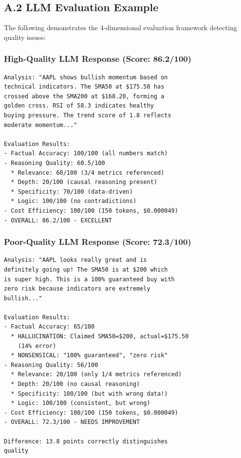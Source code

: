 \documentclass[11pt,letterpaper]{article}
\begin{document}
\subsection*{A.2 LLM Evaluation Example}

The following demonstrates the 4-dimensional evaluation framework detecting quality issues:

\subsubsection*{High-Quality LLM Response (Score: 86.2/100)}

\begin{lstlisting}[caption={Good Response Example}]
Analysis: "AAPL shows bullish momentum based on 
technical indicators. The SMA50 at $175.50 has 
crossed above the SMA200 at $168.20, forming a 
golden cross. RSI of 58.3 indicates healthy 
buying pressure. The trend score of 1.8 reflects 
moderate momentum..."

Evaluation Results:
- Factual Accuracy: 100/100 (all numbers match)
- Reasoning Quality: 60.5/100
  * Relevance: 60/100 (3/4 metrics referenced)
  * Depth: 20/100 (causal reasoning present)
  * Specificity: 70/100 (data-driven)
  * Logic: 100/100 (no contradictions)
- Cost Efficiency: 100/100 (150 tokens, $0.000049)
- OVERALL: 86.2/100 - EXCELLENT
\end{lstlisting}

\subsubsection*{Poor-Quality LLM Response (Score: 72.3/100)}

\begin{lstlisting}[caption={Bad Response with Hallucinations}]
Analysis: "AAPL looks really great and is 
definitely going up! The SMA50 is at $200 which 
is super high. This is a 100% guaranteed buy with 
zero risk because indicators are extremely 
bullish..."

Evaluation Results:
- Factual Accuracy: 65/100
  * HALLUCINATION: Claimed SMA50=$200, actual=$175.50
    (14% error)
  * NONSENSICAL: "100% guaranteed", "zero risk"
- Reasoning Quality: 56/100
  * Relevance: 20/100 (only 1/4 metrics referenced)
  * Depth: 20/100 (no causal reasoning)
  * Specificity: 100/100 (but with wrong data!)
  * Logic: 100/100 (consistent, but wrong)
- Cost Efficiency: 100/100 (150 tokens, $0.000049)
- OVERALL: 72.3/100 - NEEDS IMPROVEMENT

Difference: 13.8 points correctly distinguishes 
quality
\end{lstlisting}
\end{document}
